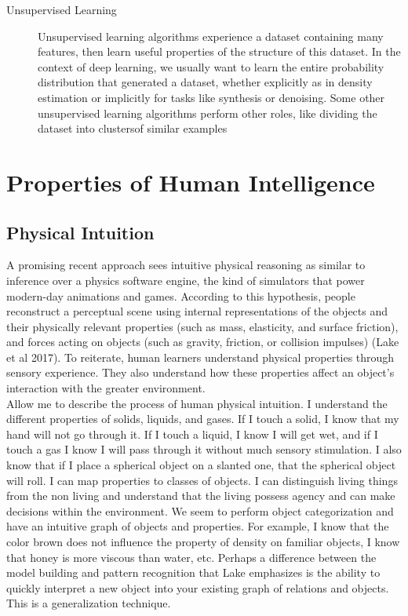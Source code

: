 \documentclass[11pt, a4paper]{article}
\begin{document}
\begin{description}
    \item[Unsupervised Learning] Unsupervised learning algorithms experience a dataset containing many features, then learn useful properties of the structure of this dataset. In the context of deep learning, we usually want to learn the entire probability distribution that generated a dataset, whether explicitly as in density estimation or implicitly for tasks like synthesis or denoising. Some other unsupervised learning algorithms perform other roles, like dividing the dataset into clustersof similar examples
\end{description}



\section{Properties of Human Intelligence}
\subsection{Physical Intuition}
A promising recent approach sees intuitive physical reasoning as similar to inference over a physics software engine, the kind of simulators that power modern-day animations and games. According to this hypothesis, people reconstruct a perceptual scene using internal representations of the objects and their physically relevant properties (such as mass, elasticity, and surface friction), and forces acting on objects (such as gravity, friction, or collision impulses) (Lake et al 2017). To reiterate, human learners understand physical properties through sensory experience. They also understand how these properties affect an object's interaction with the greater environment. \\

Allow me to describe the process of human physical intuition. I understand the different properties of solids, liquids, and gases. If I touch a solid, I know that my hand will not go through it. If I touch a liquid, I know I will get wet, and if I touch a gas I know I will pass through it without much sensory stimulation. I also know that if I place a spherical object on a slanted one, that the spherical object will roll. I can map properties to classes of objects. I can distinguish living things from the non living and understand that the living possess agency and can make decisions within the environment. We seem to perform object categorization and have an intuitive graph of objects and properties. For example, I know that the color brown does not influence the property of density on familiar objects, I know that honey is more viscous than water, etc. Perhaps a difference between the model building and pattern recognition that Lake emphasizes is the ability to quickly interpret a new object into your existing graph of relations and objects. This is a generalization technique.
\end{document}
